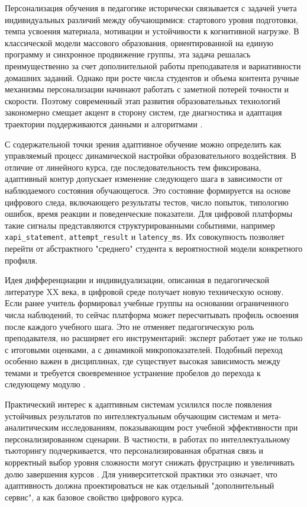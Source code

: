 Персонализация обучения в педагогике исторически связывается с задачей учета
индивидуальных различий между обучающимися: стартового уровня подготовки, темпа
усвоения материала, мотивации и устойчивости к когнитивной нагрузке. В
классической модели массового образования, ориентированной на единую программу
и синхронное продвижение группы, эта задача решалась преимущественно за счет
дополнительной работы преподавателя и вариативности домашних заданий. Однако
при росте числа студентов и объема контента ручные механизмы персонализации
начинают работать с заметной потерей точности и скорости. Поэтому современный
этап развития образовательных технологий закономерно смещает акцент в сторону
систем, где диагностика и адаптация траектории поддерживаются данными и
алгоритмами \autocite{dewey2000,pedencyclopedia1972,kornilov2022adaptive}.

С содержательной точки зрения адаптивное обучение можно определить как
управляемый процесс динамической настройки образовательного воздействия. В
отличие от линейного курса, где последовательность тем фиксирована, адаптивный
контур допускает изменение следующего шага в зависимости от наблюдаемого
состояния обучающегося. Это состояние формируется на основе цифрового следа,
включающего результаты тестов, число попыток, типологию ошибок, время реакции и
поведенческие показатели. Для цифровой платформы такие сигналы представляются
структурированными событиями, например \texttt{xapi\_statement},
\texttt{attempt\_result} и \texttt{latency\_ms}. Их совокупность позволяет
перейти от абстрактного "среднего" студента к вероятностной модели конкретного
профиля.

Идея дифференциации и индивидуализации, описанная в педагогической литературе
XX века, в цифровой среде получает новую техническую основу. Если ранее учитель
формировал учебные группы на основании ограниченного числа наблюдений, то
сейчас платформа может пересчитывать профиль освоения после каждого учебного
шага. Это не отменяет педагогическую роль преподавателя, но расширяет его
инструментарий: эксперт работает уже не только с итоговыми оценками, а с
динамикой микропоказателей. Подобный переход особенно важен в дисциплинах, где
существует высокая зависимость между темами и требуется своевременное
устранение пробелов до перехода к следующему модулю
\autocite{osmolovskaya2018,brusilovsky2003}.

Практический интерес к адаптивным системам усилился после появления устойчивых
результатов по интеллектуальным обучающим системам и мета-аналитическим
исследованиям, показывающим рост учебной эффективности при персонализированном
сценарии. В частности, в работах по интеллектуальному тьюторингу
подчеркивается, что персонализированная обратная связь и корректный выбор
уровня сложности могут снижать фрустрацию и увеличивать долю завершения курсов
\autocite{bloom1984,ma2014}. Для университетской практики это означает, что
адаптивность должна проектироваться не как отдельный "дополнительный сервис", а
как базовое свойство цифрового курса.

